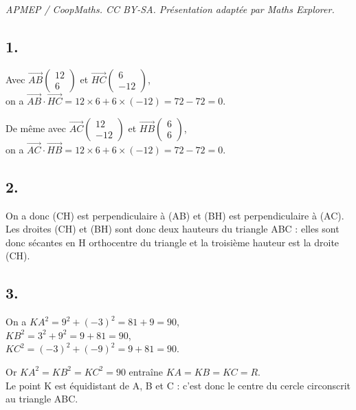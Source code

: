 \documentclass[10pt]{article}
\begin{document}
\noindent\textit{APMEP / CoopMaths. CC BY-SA. Présentation adaptée par Maths Explorer.}\par\medskip
\subsection*{1.}
	
	Avec \(\overrightarrow{AB} \left( \begin{array}{c} 12 \\ 6 \end{array} \right)\) et \(\overrightarrow{HC} \left( \begin{array}{c} 6 \\ -12 \end{array} \right)\),\\
	 on a \(\overrightarrow{AB} \cdot \overrightarrow{HC} = 12 \times 6 + 6 \times (-12) = 72 - 72 = 0\).
	
	De même avec \(\overrightarrow{AC} \left( \begin{array}{c} 12 \\ -12 \end{array} \right)\) et \(\overrightarrow{HB} \left( \begin{array}{c} 6 \\ 6 \end{array} \right)\), 
	\\on a \(\overrightarrow{AC} \cdot \overrightarrow{HB} = 12 \times 6 + 6 \times (-12) = 72 - 72 = 0\).
	
	\subsection*{2.}
	
	On a donc (CH) est perpendiculaire à (AB) et (BH) est perpendiculaire à (AC). Les droites (CH) et (BH) sont donc deux hauteurs du triangle ABC : elles sont donc sécantes en H orthocentre du triangle et la troisième hauteur est la droite (CH).
	
	\subsection*{3.}
	
	On a \(KA^2 = 9^2 + (-3)^2 = 81 + 9 = 90\),\\
	\(KB^2 = 3^2 + 9^2 = 9 + 81 = 90\),\\
	\(KC^2 = (-3)^2 + (-9)^2 = 9 + 81 = 90\).
	
	Or \(KA^2 = KB^2 = KC^2 = 90\) entraîne \(KA = KB = KC = R\). \\
	Le point K est équidistant de A, B et C : c’est donc le centre du cercle circonscrit au triangle ABC.
	
\end{document}
